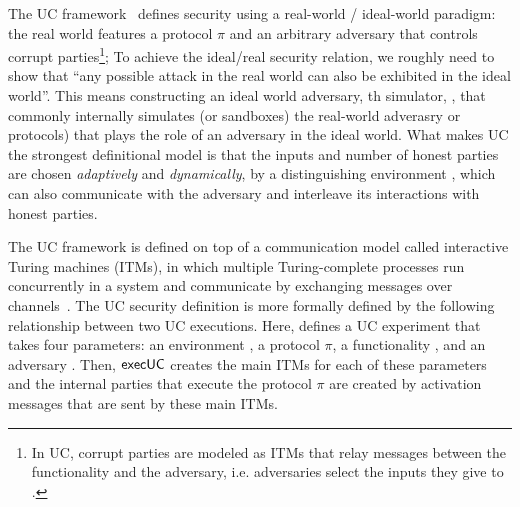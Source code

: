 The UC framework~\cite{canettiUC} defines security using
a real-world / ideal-world paradigm:
the real world features a protocol $\pi$ and an arbitrary adversary \A that controls corrupt parties\footnote{In UC, corrupt parties are modeled as ITMs that relay messages between the functionality and the adversary, i.e. adversaries select the inputs they give to \F.};
To achieve the ideal/real security relation, we roughly need to show that ``any possible attack in the real world can also be exhibited
in the ideal world''.
This means constructing an ideal world adversary, th simulator, \Sim, that commonly internally simulates (or sandboxes) the real-world adverasry or protocols) that plays the role of an adversary in the ideal world.
What makes UC the strongest definitional model is that the inputs and number of honest parties are chosen \emph{adaptively}
and \emph{dynamically}, by a distinguishing environment \Z, which can also communicate with the adversary and interleave its interactions with honest parties.

The UC framework is defined on top of a communication model called interactive Turing machines (ITMs), in which multiple Turing-complete processes run concurrently in a system and communicate by exchanging messages over channels~\cite{canettiUC}.
The UC security definition is more formally defined by the following relationship between two UC executions. 
Here,  defines a UC experiment that takes four parameters: an environment \Z, a protocol $\pi$, a functionality \F, and an adversary \A.
Then, $\mathsf{execUC}$ creates the main ITMs for each of these parameters and the internal parties that execute the protocol $\pi$ are created by
activation messages that are sent by these main ITMs.


